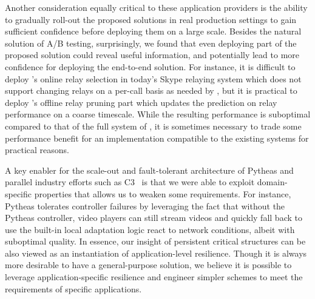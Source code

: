 Another consideration equally critical to these application 
providers is the ability to gradually roll-out the proposed 
solutions in real production settings to gain sufficient confidence
before deploying them on a large scale. Besides the natural solution of 
A/B testing, surprisingly, we found  that even deploying part of the 
proposed solution could reveal useful information, and potentially
lead to more confidence for deploying the end-to-end solution.
For instance, it is difficult to deploy \hybrid's online relay selection in 
today's Skype relaying system which does not support changing relays 
on a per-call basis as needed by \hybrid, but it is practical to 
deploy \hybrid's offline relay pruning part which updates the prediction 
on relay performance on a coarse  timescale. While the resulting performance
is suboptimal compared to that of the full system of \hybrid, 
it is sometimes necessary to trade some performance benefit for an 
implementation compatible to the existing systems for practical reasons.




A key enabler for the scale-out and fault-tolerant architecture of 
Pytheas and parallel industry efforts such as C3~\cite{c3} 
is that we
were able to  exploit domain-specific
properties that allows us to weaken some requirements.
For instance, Pytheas tolerates controller failures by leveraging
the fact that without the Pytheas controller, video players can 
still stream videos and quickly fall back to use the built-in local
adaptation logic react to
network conditions, 
albeit with suboptimal quality. In essence, our insight of 
persistent critical structures can be also viewed as an instantiation of
application-level resilience.
Though it is always more desirable to have a general-purpose 
solution, we believe it is possible to leverage application-specific resilience and
engineer simpler schemes to meet the requirements of 
specific applications.





